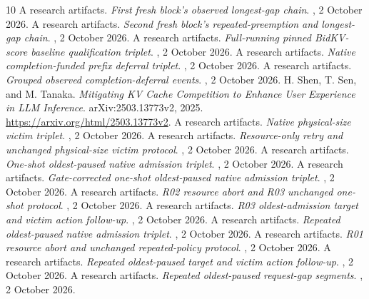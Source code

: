 \documentclass[10pt]{article}
\begin{document}
\begin{thebibliography}{10}
 A research artifacts. \emph{First fresh block's observed longest-gap chain}. , 2 October 2026.
 A research artifacts. \emph{Second fresh block's repeated-preemption and longest-gap chain}. , 2 October 2026.
 A research artifacts. \emph{Full-running pinned BidKV-score baseline qualification triplet}. , 2 October 2026.
 A research artifacts. \emph{Native completion-funded prefix deferral triplet}. , 2 October 2026.
 A research artifacts. \emph{Grouped observed completion-deferral events}. , 2 October 2026.
 H. Shen, T. Sen, and M. Tanaka. \emph{Mitigating KV Cache Competition to Enhance User Experience in LLM Inference}. arXiv:2503.13773v2, 2025. \url{https://arxiv.org/html/2503.13773v2}.
 A research artifacts. \emph{Native physical-size victim triplet}. , 2 October 2026.
 A research artifacts. \emph{Resource-only retry and unchanged physical-size victim protocol}. , 2 October 2026.
 A research artifacts. \emph{One-shot oldest-paused native admission triplet}. , 2 October 2026.
 A research artifacts. \emph{Gate-corrected one-shot oldest-paused native admission triplet}. , 2 October 2026.
 A research artifacts. \emph{R02 resource abort and R03 unchanged one-shot protocol}. , 2 October 2026.
 A research artifacts. \emph{R03 oldest-admission target and victim action follow-up}. , 2 October 2026.
 A research artifacts. \emph{Repeated oldest-paused native admission triplet}. , 2 October 2026.
 A research artifacts. \emph{R01 resource abort and unchanged repeated-policy protocol}. , 2 October 2026.
 A research artifacts. \emph{Repeated oldest-paused target and victim action follow-up}. , 2 October 2026.
 A research artifacts. \emph{Repeated oldest-paused request-gap segments}. , 2 October 2026.
\end{thebibliography}
\end{document}
